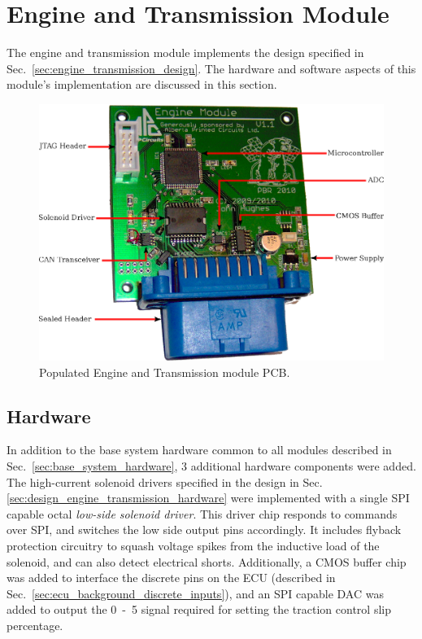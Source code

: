 \section{Engine and Transmission Module}

The engine and transmission module implements the design specified in Sec.\ \ref{sec:engine_transmission_design}. The hardware and software aspects of this module's implementation are discussed in this section.

\begin{figure}[H]
\centering
\includegraphics[scale=1]{implementation/figures/engine_transmission_pcb}
\caption{Populated Engine and Transmission module PCB.}
\label{fig:engine_transmission_pcb}
\end{figure}

\subsection{Hardware}

In addition to the base system hardware common to all modules described in Sec.\ \ref{sec:base_system_hardware}, 3 additional hardware components were added. The high-current solenoid drivers specified in the design in Sec. \ref{sec:design_engine_transmission_hardware} were implemented with a single SPI capable octal \emph{low-side solenoid driver}. This driver chip responds to commands over SPI, and switches the low side output pins accordingly. It includes flyback protection circuitry to squash voltage spikes from the inductive load of the solenoid, and can also detect electrical shorts. Additionally, a CMOS buffer chip was added to interface the discrete pins on the ECU (described in Sec.\ \ref{sec:ecu_background_discrete_inputs}), and an SPI capable DAC was added to output the \unit{0-5}{\volt} signal required for setting the traction control slip percentage.

